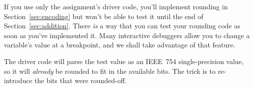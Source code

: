 If you use only the assignment's driver code, you'll implement rounding in Section~\ref{sec:encoding} but won't be able to test it until the end of Section~\ref{sec:addition}.
There \textit{is} a way that you can test your rounding code as soon as you've implemented it.
Many interactive debuggers allow you to change a variable's value at a breakpoint, and we shall take advantage of that feature.

\begin{description}
\end{description}

The driver code will parse the test value as an IEEE~754 single-precision value, so it will \textit{already} be rounded to fit in the available bits.
The trick is to re-introduce the bits that were rounded-off.

